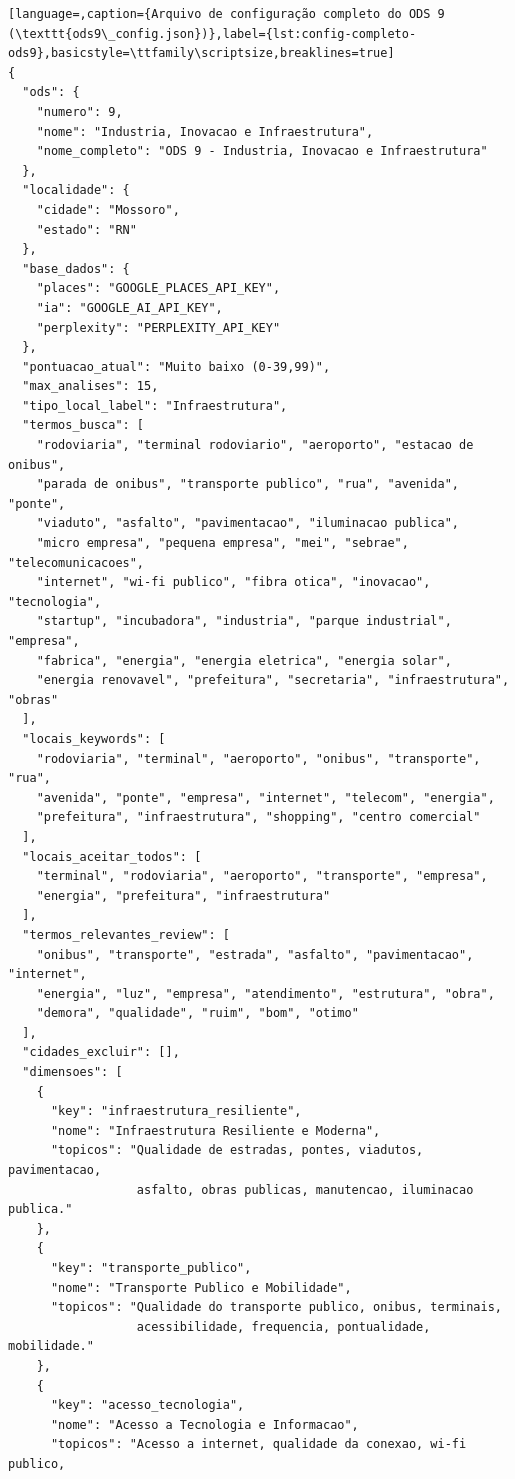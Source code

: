 \begin{lstlisting}[language=,caption={Arquivo de configuração completo do ODS 9 (\texttt{ods9\_config.json})},label={lst:config-completo-ods9},basicstyle=\ttfamily\scriptsize,breaklines=true]
{
  "ods": {
    "numero": 9,
    "nome": "Industria, Inovacao e Infraestrutura",
    "nome_completo": "ODS 9 - Industria, Inovacao e Infraestrutura"
  },
  "localidade": {
    "cidade": "Mossoro",
    "estado": "RN"
  },
  "base_dados": {
    "places": "GOOGLE_PLACES_API_KEY",
    "ia": "GOOGLE_AI_API_KEY",
    "perplexity": "PERPLEXITY_API_KEY"
  },
  "pontuacao_atual": "Muito baixo (0-39,99)",
  "max_analises": 15,
  "tipo_local_label": "Infraestrutura",
  "termos_busca": [
    "rodoviaria", "terminal rodoviario", "aeroporto", "estacao de onibus",
    "parada de onibus", "transporte publico", "rua", "avenida", "ponte",
    "viaduto", "asfalto", "pavimentacao", "iluminacao publica",
    "micro empresa", "pequena empresa", "mei", "sebrae", "telecomunicacoes",
    "internet", "wi-fi publico", "fibra otica", "inovacao", "tecnologia",
    "startup", "incubadora", "industria", "parque industrial", "empresa",
    "fabrica", "energia", "energia eletrica", "energia solar",
    "energia renovavel", "prefeitura", "secretaria", "infraestrutura", "obras"
  ],
  "locais_keywords": [
    "rodoviaria", "terminal", "aeroporto", "onibus", "transporte", "rua",
    "avenida", "ponte", "empresa", "internet", "telecom", "energia",
    "prefeitura", "infraestrutura", "shopping", "centro comercial"
  ],
  "locais_aceitar_todos": [
    "terminal", "rodoviaria", "aeroporto", "transporte", "empresa",
    "energia", "prefeitura", "infraestrutura"
  ],
  "termos_relevantes_review": [
    "onibus", "transporte", "estrada", "asfalto", "pavimentacao", "internet",
    "energia", "luz", "empresa", "atendimento", "estrutura", "obra",
    "demora", "qualidade", "ruim", "bom", "otimo"
  ],
  "cidades_excluir": [],
  "dimensoes": [
    {
      "key": "infraestrutura_resiliente",
      "nome": "Infraestrutura Resiliente e Moderna",
      "topicos": "Qualidade de estradas, pontes, viadutos, pavimentacao,
                  asfalto, obras publicas, manutencao, iluminacao publica."
    },
    {
      "key": "transporte_publico",
      "nome": "Transporte Publico e Mobilidade",
      "topicos": "Qualidade do transporte publico, onibus, terminais,
                  acessibilidade, frequencia, pontualidade, mobilidade."
    },
    {
      "key": "acesso_tecnologia",
      "nome": "Acesso a Tecnologia e Informacao",
      "topicos": "Acesso a internet, qualidade da conexao, wi-fi publico,

\end{lstlisting}
